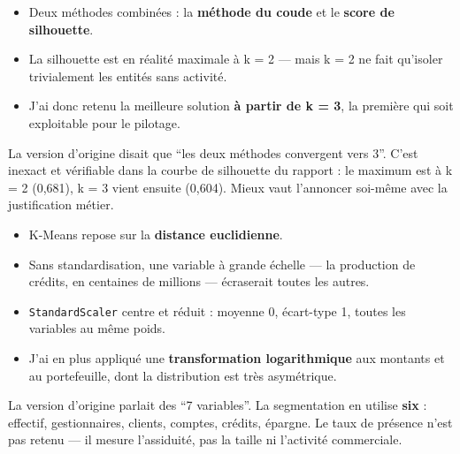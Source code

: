 \documentclass[a4paper,11pt]{article}
\begin{document}
\begin{itemize}[leftmargin=*,itemsep=1pt]
  \item Deux méthodes combinées : la \textbf{méthode du coude} et le \textbf{score de silhouette}.
  \item La silhouette est en réalité maximale à k = 2 --- mais k = 2 ne fait qu'isoler trivialement les entités sans activité.
  \item J'ai donc retenu la meilleure solution \textbf{à partir de k = 3}, la première qui soit exploitable pour le pilotage.
\end{itemize}

\begin{corrige}
La version d'origine disait que \enquote{les deux méthodes convergent vers 3}.
C'est inexact et vérifiable dans la courbe de silhouette du rapport : le maximum
est à k = 2 (0,681), k = 3 vient ensuite (0,604). Mieux vaut l'annoncer
soi-même avec la justification métier.
\end{corrige}


\begin{itemize}[leftmargin=*,itemsep=1pt]
  \item K-Means repose sur la \textbf{distance euclidienne}.
  \item Sans standardisation, une variable à grande échelle --- la production de crédits, en centaines de millions --- écraserait toutes les autres.
  \item \texttt{StandardScaler} centre et réduit : moyenne 0, écart-type 1, toutes les variables au même poids.
  \item J'ai en plus appliqué une \textbf{transformation logarithmique} aux montants et au portefeuille, dont la distribution est très asymétrique.
\end{itemize}

\begin{corrige}
La version d'origine parlait des \enquote{7 variables}. La segmentation en
utilise \textbf{six} : effectif, gestionnaires, clients, comptes, crédits,
épargne. Le taux de présence n'est pas retenu --- il mesure l'assiduité, pas la
taille ni l'activité commerciale.
\end{corrige}
\end{document}
